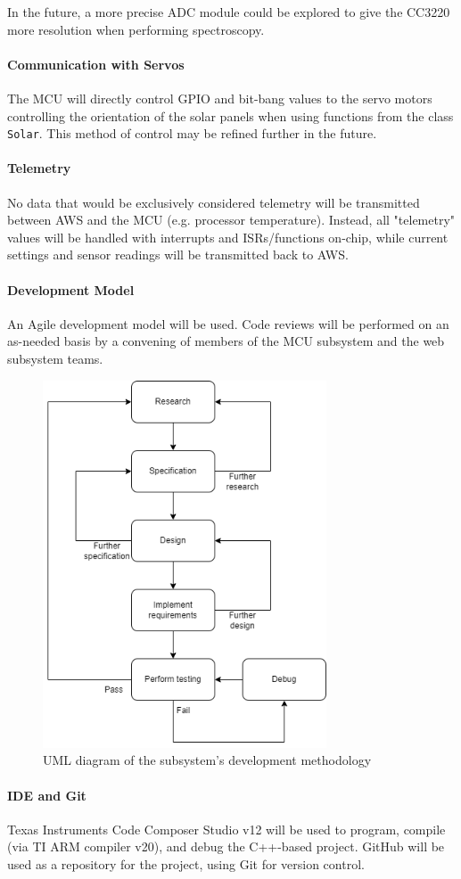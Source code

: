 In the future, a more precise ADC module could be explored to give the
CC3220 more resolution when performing spectroscopy.

\paragraph{Communication with Servos}
The MCU will directly control GPIO and bit-bang values to the servo motors
controlling the orientation of the solar panels when using functions from
the class \texttt{Solar}. This method of control may be refined further in
the future.

\paragraph{Telemetry}
No data that would be exclusively considered telemetry will be transmitted 
between AWS and the MCU (e.g. processor temperature). Instead, all
"telemetry" values will be handled with interrupts and ISRs/functions
on-chip, while current settings and sensor readings will be transmitted
back to AWS.

\paragraph{Development Model}
An Agile development model will be used. Code reviews will be performed on
an as-needed basis by a convening of members of the MCU subsystem and the
web subsystem teams.
\begin{figure}[H]
    \caption{UML diagram of the subsystem's development methodology}
    \label{mcu_agile_uml}
    \centering
    \includegraphics[width=0.75\textwidth]{images/mcu_agile_uml.png}
\end{figure}

\paragraph{IDE and Git}
Texas Instruments Code Composer Studio v12 will be used to program,
compile (via TI ARM compiler v20), and debug the C++-based project. GitHub
will be used as a repository for the project, using Git for version
control.
